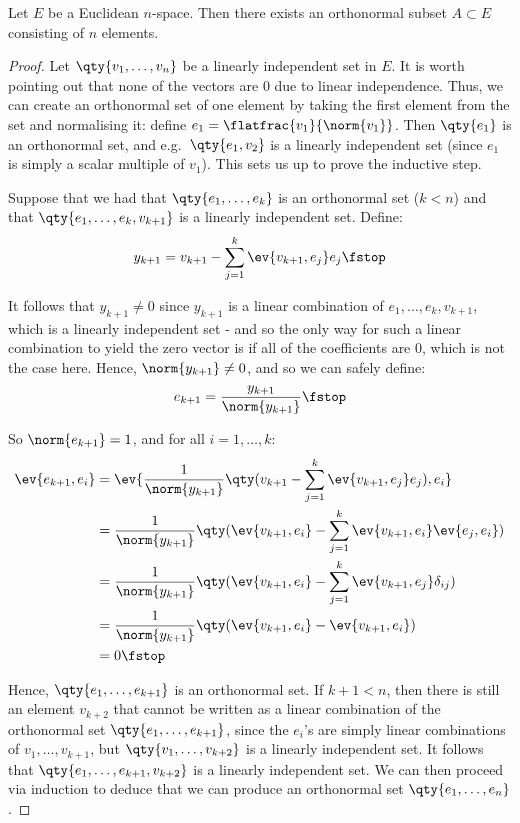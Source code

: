 \begin{proposition}
  Let \( E \) be a Euclidean \( n \)-space. Then there exists an orthonormal subset \( A\subset E \) consisting of \( n \) elements.
\end{proposition}
\begin{proof}
  Let \( \qty{v_1,\dots,v_n} \) be a linearly independent set in \( E \). It is worth pointing out that none of the vectors are 0 due to linear independence. Thus, we can create an orthonormal set of one element by taking the first element from the set and normalising it: define \( e_1=\flatfrac{v_1}{\norm{v_1}} \). Then \( \qty{e_1} \) is an orthonormal set, and e.g.\ \( \qty{e_1,v_2} \) is a linearly independent set (since \( e_1 \) is simply a scalar multiple of \( v_1 \)). This sets us up to prove the inductive step.

  \vspace{3mm}

  Suppose that we had that \( \qty{e_1,\dots,e_k} \) is an orthonormal set (\( k<n \)) and that \( \qty{e_1,\dots,e_k,v_{k+1}} \) is a linearly independent set. Define:
  \[ y_{k+1}=v_{k+1}-\sum_{j=1}^k\ev{v_{k+1},e_j}e_j\fstop \]
  
  It follows that \( y_{k+1}\neq 0 \) since \( y_{k+1} \) is a linear combination of \( e_1,\dots,e_k,v_{k+1} \), which is a linearly independent set - and so the only way for such a linear combination to yield the zero vector is if all of the coefficients are 0, which is not the case here. Hence, \( \norm{y_{k+1}}\neq 0 \), and so we can safely define:
  \[ e_{k+1}=\frac{y_{k+1}}{\norm{y_{k+1}}}\fstop \]

  So \( \norm{e_{k+1}}=1 \), and for all \( i=1,\dots,k \):
  \begin{align*}
    \ev{e_{k+1},e_i}&=\ev{\frac{1}{\norm{y_{k+1}}}\qty(v_{k+1}-\sum_{j=1}^k\ev{v_{k+1},e_j}e_j),e_i}\\
    &= \frac{1}{\norm{y_{k+1}}}\qty(\ev{v_{k+1},e_i}-\sum_{j=1}^k\ev{v_{k+1},e_i}\ev{e_j,e_i})\\
    &= \frac{1}{\norm{y_{k+1}}}\qty(\ev{v_{k+1},e_i}-\sum_{j=1}^k\ev{v_{k+1},e_j}\delta_{ij})\\
    &= \frac{1}{\norm{y_{k+1}}}\qty(\ev{v_{k+1},e_i}-\ev{v_{k+1},e_i})\\
    &= 0\fstop
  \end{align*}

  Hence, \( \qty{e_1,\dots,e_{k+1}} \) is an orthonormal set. If \( k+1<n \), then there is still an element \( v_{k+2} \) that cannot be written as a linear combination of the orthonormal set \( \qty{e_1,\dots,e_{k+1}} \), since the \( e_i \)'s are simply linear combinations of \( v_1,\dots,v_{k+1} \), but \( \qty{v_1,\dots,v_{k+2}} \) is a linearly independent set. It follows that \( \qty{e_1,\dots,e_{k+1},v_{k+2}} \) is a linearly independent set. We can then proceed via induction to deduce that we can produce an orthonormal set \( \qty{e_1,\dots, e_n} \).
\end{proof}

